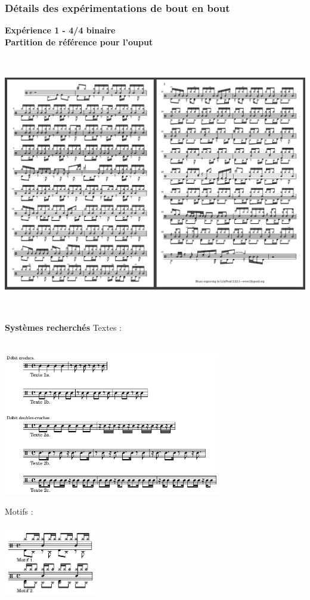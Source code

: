 \subsubsection{Détails des expérimentations de bout en bout}
\textbf{Expérience 1 - 4/4 binaire}\\
\textbf{Partition de référence pour l’ouput}
\includegraphics[height=120mm, width=160mm]{z_images/4_experimentations/experience_1/partition.png}
\textbf{Systèmes recherchés}
Textes :\\\\
\includegraphics[height=70mm, width=95mm]{z_images/1_description_notation/systemes/0_textes_4-4_binaires.png}\\
Motifs :\\\\
\includegraphics[height=30mm, width=40mm]{z_images/1_description_notation/systemes/1_motifs_4-4_binaires.png}\\\\
